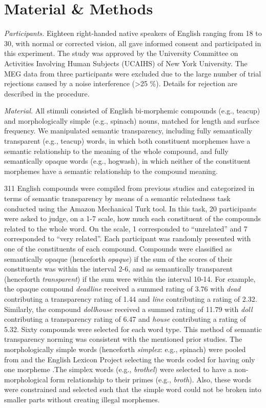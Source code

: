 \documentclass{frontiersSCNS}
\begin{document}
\section{Material \& Methods}

\textit{Participants.} Eighteen right-handed native speakers of English ranging from 18 to 30, with normal or corrected vision, all gave informed consent and participated in this experiment. The study was approved by the University Committee on Activities Involving Human Subjects (UCAIHS) of New York University. The MEG data from three participants were excluded due to the large number of trial rejections caused by a noise interference (\textgreater 25 \%). Details for rejection are described in the procedure.

\textit{Material.}  All stimuli consisted of English bi-morphemic compounds (e.g., teacup) and morphologically simple (e.g., spinach) nouns, matched for length and surface frequency. We manipulated semantic transparency, including fully semantically transparent (e.g., teacup) words, in which both constituent morphemes have a semantic relationship to the meaning of the whole compound, and fully semantically opaque words (e.g., hogwash), in which neither of the constituent morphemes have a semantic relationship to the compound meaning.

	311 English compounds were compiled from previous studies \citep*{Drieghe:2010, Fiorentino:2007, Fiorentino:2009, Juhasz:2003} and categorized in terms of semantic transparency by means of a semantic relatedness task conducted using the Amazon Mechanical Turk tool. In this task, 20 participants were asked to judge, on a 1-7 scale, how much each constituent of the compounds related to the whole word.  On the scale, 1 corresponded to “unrelated” and 7 corresponded to “very related”.  Each participant was randomly presented with one of the constituents of each compound.  Compounds were classified as semantically opaque (henceforth \textit{opaque}) if the sum of the scores of their constituents was within the interval 2-6, and as semantically transparent (henceforth \textit{transparent}) if the sum were within the interval 10-14. For example, the opaque compound \textit{deadline} received a summed rating of 3.76 with \textit{dead} contributing a transparency rating of 1.44 and \textit{line} contributing a rating of 2.32. Similarly, the compound \textit{dollhouse} received a summed rating of 11.79 with \textit{doll} contributing a transparency rating of 6.47 and \textit{house} contributing a rating of 5.32. Sixty compounds were selected for each word type. This method of semantic transparency norming was consistent with the mentioned prior studies. 
	The morphologically simple words (henceforth \textit{simplex}: e.g., spinach) were pooled from \citet{Rastle:2004} and the English Lexicon Project selecting the words coded for having only one morpheme \citep*{Balota:2007}.The simplex words (e.g., \textit{brothel}) were selected to have a non-morphological form relationship to their primes (e.g., \textit{broth}). Also, these words were constrained and selected such that the simple word could not be broken into smaller parts without creating illegal morphemes.
 
\end{document}
